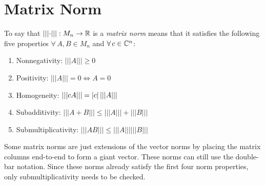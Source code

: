 \documentclass[letterpaper,12pt,fleqn]{article}
\newcommand{\mnorm}[1]{\left\lvert\left\lvert\left\lvert#1
  \right\rvert\right\rvert\right\rvert}
\begin{document}
\section*{Matrix Norm}

\begin{definition}
  To say that $\mnorm{\cdot}:M_n\to\R$ is a \emph{matrix norm} means that it
  satisfies the following five properties $\forall\,A,B\in M_n$ and
  $\forall\,c\in\mathbb{C}^n$:
  \begin{enumerate}
  \item Nonnegativity: $\mnorm{A}\ge0$
  \item Positivity: $\mnorm{A}=0\iff A=0$
  \item Homogeneity: $\mnorm{cA}=\abs{c}\mnorm{A}$
  \item Subadditivity: $\mnorm{A+B}\le\mnorm{A}+\mnorm{B}$
  \item Submultiplicativity: $\mnorm{AB}\le\mnorm{A}\mnorm{B}$
  \end{enumerate}
\end{definition}

Some matrix norms are just extensions of the vector norms by placing the
matrix columns end-to-end to form a giant vector. These norms can still use
the double-bar notation. Since these norms already satisfy the first four norm
properties, only submultiplicativity needs to be checked.
\end{document}
